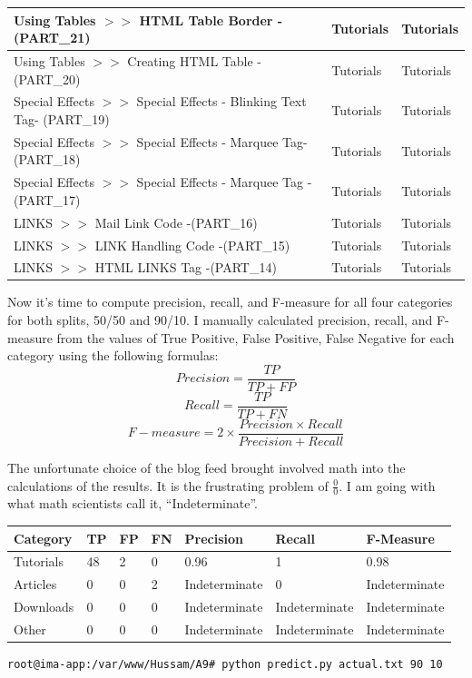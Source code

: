 \documentclass[a4paper, 11pt]{article}
\begin{document}
\begin{longtable}{ |p{10cm}|p{2cm}|p{2cm}| }
Using Tables $>>$ HTML Table Border - (PART\_21)
&
Tutorials
&
Tutorials \\
\hline
Using Tables $>>$ Creating HTML Table - (PART\_20)
&
Tutorials
&
Tutorials \\
\hline
Special Effects $>>$ Special Effects - Blinking Text Tag- (PART\_19)
&
Tutorials
&
Tutorials \\
\hline
Special Effects $>>$ Special Effects - Marquee Tag- (PART\_18)
&
Tutorials
&
Tutorials \\
\hline
Special Effects $>>$ Special Effects - Marquee Tag -(PART\_17)
&
Tutorials
&
Tutorials \\
\hline
LINKS $>>$ Mail Link Code -(PART\_16)
&
Tutorials
&
Tutorials \\
\hline
LINKS $>>$ LINK Handling Code  -(PART\_15)
&
Tutorials
&
Tutorials \\
\hline
LINKS  $>>$   HTML LINKS Tag  -(PART\_14)
&
Tutorials
&
Tutorials \\
\hline
\end{longtable}

Now it's time to compute precision, recall, and F-measure for all four categories for both splits, 50/50 and 90/10. I manually calculated precision, recall, and F-measure from the values of True Positive, False Positive, False Negative for each category using the following formulas:
$$
Precision = \frac{TP}{TP+FP}
$$
$$
Recall = \frac{TP}{TP+FN}
$$
$$
F-measure = 2\times\frac{Precision \times Recall}{Precision + Recall}
$$

The unfortunate choice of the blog feed brought involved math into the calculations of the results. It is the frustrating problem of $\frac{0}{0}$. I am going with what math scientists call it, ``Indeterminate''.

\begin{longtable}{ |p{2cm}|p{0.5cm}|p{0.5cm}|p{0.5cm}|p{2.5cm}|p{2.5cm}|p{2.5cm}| }
\hline
Category
&
TP
&
FP
&
FN
&
Precision
&
Recall
&
F-Measure \\
\hline
Tutorials
&
48
&
2
&
0
&
0.96
&
1
&
0.98 \\
\hline
Articles
&
0
&
0
&
2
&
Indeterminate
&
0
&
Indeterminate \\
\hline
Downloads
&
0
&
0
&
0
&
Indeterminate
&
Indeterminate
&
Indeterminate \\
\hline
Other
&
0
&
0
&
0
&
Indeterminate
&
Indeterminate
&
Indeterminate \\
\hline
\end{longtable}

\begin{lstlisting}[language=bash, breakatwhitespace=〈false), label=Running predict.py: Training 90 Predicting 10, caption= Running predict.py: Training 90 Predicting 10]
root@ima-app:/var/www/Hussam/A9# python predict.py actual.txt 90 10
\end{lstlisting}
\end{document}
